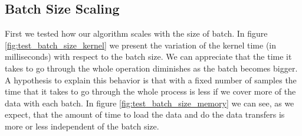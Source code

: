 \documentclass[11pt,a4paper]{article}
\begin{document}
\subsection{Batch Size Scaling}

First we tested how our algorithm scales with the size of batch. 
In figure \ref{fig:test_batch_size_kernel} we present the variation 
of the kernel time (in milliseconds) with respect to the batch size. 
We can appreciate that the time it takes to go through the whole operation 
diminishes as the batch becomes bigger. A hypothesis to explain this behavior 
is that with a fixed number of samples the time that it takes to go through the 
whole process is less if we cover more of the data with each batch. 
In figure \ref{fig:test_batch_size_memory} we can see, as we expect, 
that the amount of time to load the data and do the data transfers is 
more or less independent of the batch size. 
\end{document}
